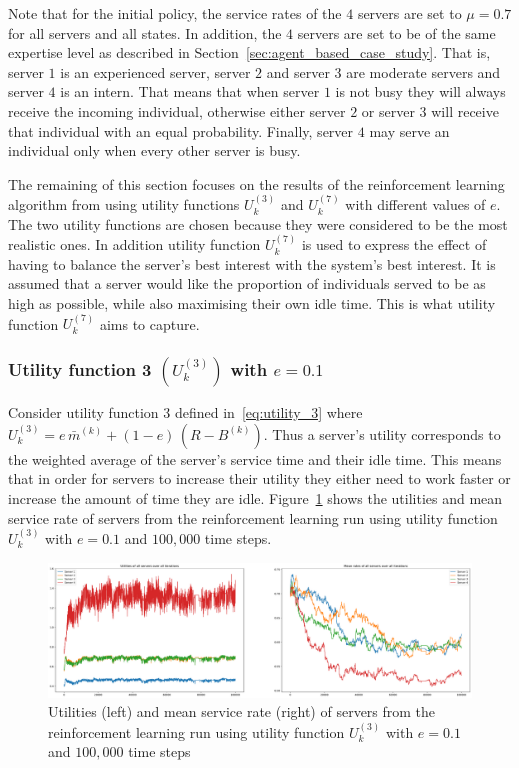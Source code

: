 Note that for the initial policy, the service rates of the \(4\) servers are
set to \(\mu = 0.7\) for all servers and all states.
In addition, the \(4\) servers are set to be of the same expertise level as
described in Section~\ref{sec:agent_based_case_study}.
That is, server \(1\) is an experienced server, server \(2\) and server
\(3\) are moderate servers and server \(4\) is an intern.
That means that when server \(1\) is not busy they will always receive the
incoming individual, otherwise either server \(2\) or server \(3\) will
receive that individual with an equal probability.
Finally, server \(4\) may serve an individual only when every other server is
busy.

The remaining of this section focuses on the results of the reinforcement
learning algorithm from using utility functions \(U_k^{(3)}\) and
\(U_k^{(7)}\) with different values of \(e\).
The two utility functions are chosen because they were considered to be the
most realistic ones.
In addition utility function \(U_k^{(7)}\) is used to express the effect of
having to balance the server's best interest with the system's best interest.
It is assumed that a server would like the proportion of individuals served
to be as high as possible, while also maximising their own idle time.
This is what utility function \(U_k^{(7)}\) aims to capture.

\subsubsection{Utility function 3 \((U_k^{(3)})\) with \(e = 0.1\)}
\label{sec:utility_3_results}

Consider utility function 3 defined in~\eqref{eq:utility_3} where
\(U_k^{(3)} = e \, \bar{m}^{(k)} + (1 - e) \, (R - B^{(k)})\).
Thus a server's utility corresponds to the weighted average of the server's
service time and their idle time.
This means that in order for servers to increase their utility they either
need to work faster or increase the amount of time they are idle.
Figure~\ref{fig:RL_utility3_1_e01} shows the utilities and mean service rate
of servers from the reinforcement learning run using utility function
\(U_k^{(3)}\) with \(e = 0.1\) and \(100,\!000\) time steps.

\begin{figure}[H]
    \includegraphics[width=\textwidth]{chapters/06_agent_based_extension/Bin/reinforcement_learning_results/utility_3/u3_1_e01.pdf}
    \caption{Utilities (left) and mean service rate (right) of servers from the
    reinforcement learning run using utility function \(U_k^{(3)}\) with
    \(e = 0.1\) and \(100,\!000\) time steps}
    \label{fig:RL_utility3_1_e01}
\end{figure}


